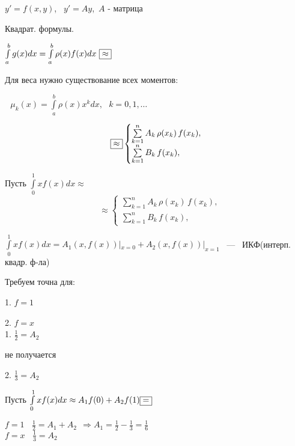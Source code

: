\documentclass[12pt]{article}
\begin{document}
$y' = f(x,y)$, \ $y' = Ay$,\ $A$ - матрица


\begin{center}
Квадрат. формулы.
\end{center}

$\int\limits_a^b g(x)dx = \int\limits_a^b \rho(x)f(x)dx \ \fbox{$\approx$}$



Для веса нужно существование всех моментов:

$\ \ \ \mu_k(x) = \int\limits_a^b \rho(x)x^kdx, \ \ \ k = 0, 1,\ldots$


\begin{equation*}
\quad \fbox{$\approx$}
 \begin{cases}
   \sum\limits_{k=1}^n A_k \, \rho(x_k) \, f(x_k),
   \\
   \sum\limits_{k=1}^n B_k \, f(x_k),
 \end{cases}
\end{equation*}


Пусть $\int\limits_0^1 xf(x)dx \approx$
\begin{equation*}
\quad \approx
 \begin{cases}
   \sum\limits_{k=1}^n A_k \, \rho(x_k) \, f(x_k),
   \\
   \sum\limits_{k=1}^n B_k \, f(x_k),
 \end{cases}
\end{equation*}

$\int\limits_0^1 xf(x)dx = A_1(x, f(x))|_{x=0} +  A_2(x, f(x))|_{x=1}$ \ --- \ ИКФ(интерп. квадр. ф-ла)

Требуем точна для:

1. $f = 1$

2. $f = x$
\\

1. $\displaystyle{\frac{1}{2} = A_2}$

\centerline{не получается}

2. $\displaystyle{\frac{1}{3} = A_2}$



\newpage



Пусть $\int\limits_0^1 xf(x)dx \approx A_1f(0) + A_2f(1)\fbox{=}$

{
\setlength{\leftskip}{3em}
$f = 1 \ \ \ \ \displaystyle{\frac{1}{2}} = A_1 + A_2 \ \ \Rightarrow A_1 = \displaystyle{\frac{1}{2}} - \displaystyle{\frac{1}{3}} = \displaystyle{\frac{1}{6}}$
\\

$f = x \ \ \ \ \displaystyle{\frac{1}{3}} = A_2$

}
\end{document}
